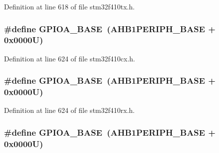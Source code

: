 Definition at line 618 of file stm32f410tx.\+h.

\subsubsection[{\texorpdfstring{G\+P\+I\+O\+A\+\_\+\+B\+A\+SE}{GPIOA_BASE}}]{\setlength{\rightskip}{0pt plus 5cm}\#define G\+P\+I\+O\+A\+\_\+\+B\+A\+SE~({\bf A\+H\+B1\+P\+E\+R\+I\+P\+H\+\_\+\+B\+A\+SE} + 0x0000\+U)}\hypertarget{group___peripheral__registers__structures_gad7723846cc5db8e43a44d78cf21f6efa}{}\label{group___peripheral__registers__structures_gad7723846cc5db8e43a44d78cf21f6efa}


Definition at line 624 of file stm32f410cx.\+h.

\subsubsection[{\texorpdfstring{G\+P\+I\+O\+A\+\_\+\+B\+A\+SE}{GPIOA_BASE}}]{\setlength{\rightskip}{0pt plus 5cm}\#define G\+P\+I\+O\+A\+\_\+\+B\+A\+SE~({\bf A\+H\+B1\+P\+E\+R\+I\+P\+H\+\_\+\+B\+A\+SE} + 0x0000\+U)}\hypertarget{group___peripheral__registers__structures_gad7723846cc5db8e43a44d78cf21f6efa}{}\label{group___peripheral__registers__structures_gad7723846cc5db8e43a44d78cf21f6efa}


Definition at line 624 of file stm32f410rx.\+h.

\subsubsection[{\texorpdfstring{G\+P\+I\+O\+A\+\_\+\+B\+A\+SE}{GPIOA_BASE}}]{\setlength{\rightskip}{0pt plus 5cm}\#define G\+P\+I\+O\+A\+\_\+\+B\+A\+SE~({\bf A\+H\+B1\+P\+E\+R\+I\+P\+H\+\_\+\+B\+A\+SE} + 0x0000\+U)}\hypertarget{group___peripheral__registers__structures_gad7723846cc5db8e43a44d78cf21f6efa}{}\label{group___peripheral__registers__structures_gad7723846cc5db8e43a44d78cf21f6efa}


